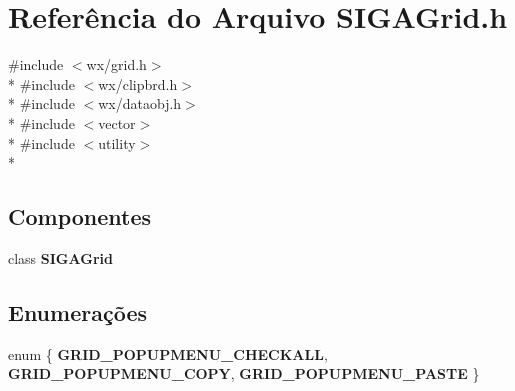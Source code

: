\section{Referência do Arquivo S\+I\+G\+A\+Grid.\+h}
\label{_s_i_g_a_grid_8h}
{\ttfamily \#include $<$wx/grid.\+h$>$}\\*
{\ttfamily \#include $<$wx/clipbrd.\+h$>$}\\*
{\ttfamily \#include $<$wx/dataobj.\+h$>$}\\*
{\ttfamily \#include $<$vector$>$}\\*
{\ttfamily \#include $<$utility$>$}\\*
\subsection*{Componentes}
\begin{DoxyCompactItemize}
\item 
class {\bf S\+I\+G\+A\+Grid}
\end{DoxyCompactItemize}
\subsection*{Enumerações}
\begin{DoxyCompactItemize}
\item 
enum \{ {\bf G\+R\+I\+D\+\_\+\+P\+O\+P\+U\+P\+M\+E\+N\+U\+\_\+\+C\+H\+E\+C\+K\+A\+LL}, 
{\bf G\+R\+I\+D\+\_\+\+P\+O\+P\+U\+P\+M\+E\+N\+U\+\_\+\+C\+O\+PY}, 
{\bf G\+R\+I\+D\+\_\+\+P\+O\+P\+U\+P\+M\+E\+N\+U\+\_\+\+P\+A\+S\+TE}
 \}
\end{DoxyCompactItemize}
